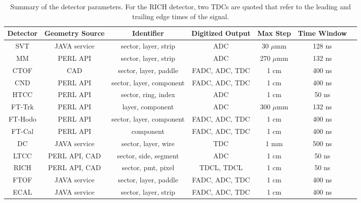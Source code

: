 \begin{table*}
    \begin{center}
        \begin{tabular}{| c | c | c | c | c | c | c | }
            \hline \hline
Detector &  Geometry Source &           Identifier  &  Digitized Output  &  Max Step & Time Window  \\
            \hline
SVT       &     JAVA service  & sector, layer, strip      &  ADC             & 30 $\mu$mm  & 128 ns    \\
MM        &     PERL API      & sector, layer, strip      &  ADC             & 270 $\mu$mm & 132 ns    \\
CTOF      &     CAD           & sector, layer, paddle     &  FADC, ADC, TDC  & 1 cm        & 400 ns    \\
CND       &     PERL API      & sector, layer, component  &  FADC, ADC, TDC  & 1 cm        & 400 ns    \\
HTCC      &     PERL API      & sector, ring, index       &  ADC             & 1 cm        & 50 ns     \\
FT-Trk    &     PERL API      & layer, component          &  ADC             & 300 $\mu$mm & 132 ns    \\
FT-Hodo   &     PERL API      & sector, layer, component  &  FADC, ADC, TDC  & 1 cm        & 400 ns    \\
FT-Cal    &     PERL API      & component                 &  FADC, ADC, TDC  & 1 cm        & 400 ns    \\
DC        &     JAVA service  & sector, layer, wire       &  TDC             & 1 mm        & 500 ns    \\
LTCC      &     PERL API, CAD & sector, side, segment     &  ADC             & 1 cm        &  50 ns    \\
RICH      &     PERL API, CAD & sector, pmt, pixel        &  TDCL, TDCL      & 1 cm        &  50 ns    \\
FTOF      &     JAVA service  & sector, layer, paddle     &  FADC, ADC, TDC  & 1 cm        & 400 ns    \\
ECAL        &     JAVA service  & sector, layer, strip      &  FADC, ADC, TDC  & 1 cm        & 400 ns    \\
            \hline \hline
        \end{tabular}
    \end{center}
    \caption{Summary of the detector parameters. For the RICH detector, two TDCs are quoted that refer to
    the leading and trailing edge times of the signal.}\label{tab:summary}
\end{table*}
